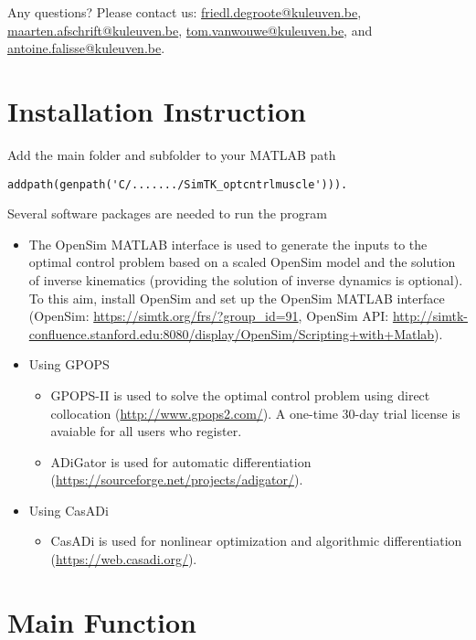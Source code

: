 \documentclass[a4paper,oneside,11pt]{article}
\begin{document}
Any questions? Please contact us: \href{friedl.degroote@kuleuven.be}{friedl.degroote@kuleuven.be}, \href{maarten.afschrift@kuleuven.be}{maarten.afschrift@kuleuven.be}, \href{tom.vanwouwe@kuleuven.be}{tom.vanwouwe@kuleuven.be}, and \href{antoine.falisse@kuleuven.be}{antoine.falisse@kuleuven.be}.



\section{Installation Instruction}

Add the main folder and subfolder to your MATLAB path 
\begin{lstlisting}
addpath(genpath('C/......./SimTK_optcntrlmuscle'))).
\end{lstlisting}

Several software packages are needed to run the program
\begin{itemize}
	\item The OpenSim MATLAB interface is used to generate the inputs to the optimal control problem based on a scaled OpenSim model and the solution of inverse kinematics (providing the solution of inverse dynamics is optional). To this aim, install OpenSim and set up the OpenSim MATLAB interface (OpenSim: \url{https://simtk.org/frs/?group_id=91}, OpenSim API: \url{http://simtk-confluence.stanford.edu:8080/display/OpenSim/Scripting+with+Matlab}).
	\item Using GPOPS
	\begin{itemize}
	\item GPOPS-II is used to solve the optimal control problem using direct collocation (\url{http://www.gpops2.com/}). A one-time 30-day trial license is avaiable for all users who register.
	\item ADiGator is used for automatic differentiation (\url{https://sourceforge.net/projects/adigator/}).
	\end{itemize}
	\item Using CasADi
	\begin{itemize}
	\item CasADi is used for nonlinear optimization and algorithmic differentiation (\url{https://web.casadi.org/}).
	\end{itemize}
\end{itemize}

\section{Main Function}
\end{document}
